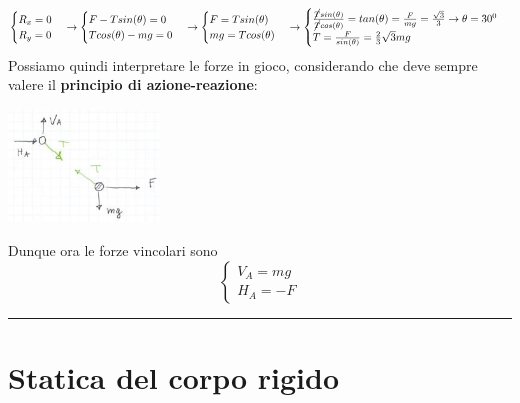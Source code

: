 \[
    \begin{cases}
        R_x = 0\\
        R_y=0
    \end{cases} \rightarrow  \begin{cases}
        F-T sin(\theta) = 0\\
        T cos(\theta) - mg = 0
    \end{cases} \rightarrow \begin{cases}
        F = T sin(\theta)\\
        mg = T cos(\theta)
    \end{cases} \rightarrow \begin{cases}
        \frac{\cancel{T} sin(\theta)}{\cancel{T} cos(\theta)} = tan(\theta) = \frac{F}{mg} = \frac{\sqrt{3}}{3} \rightarrow \theta = 30^0\\
        T = \frac{F}{sin(\theta)} = \frac{2}{3}\sqrt{3}mg
    \end{cases}
\]
Possiamo quindi interpretare le forze in gioco, considerando che deve sempre valere il \textbf{principio di azione-reazione}:
\begin{center}
    \includegraphics[height=3cm]{../lezione6/img9.JPG}
\end{center}
Dunque ora le forze vincolari sono
\[
    \begin{cases}
        V_A = mg\\
        H_A = -F
    \end{cases}
\]
\rule{\textwidth}{0,4pt}
\newpage
\section{Statica del corpo rigido}
